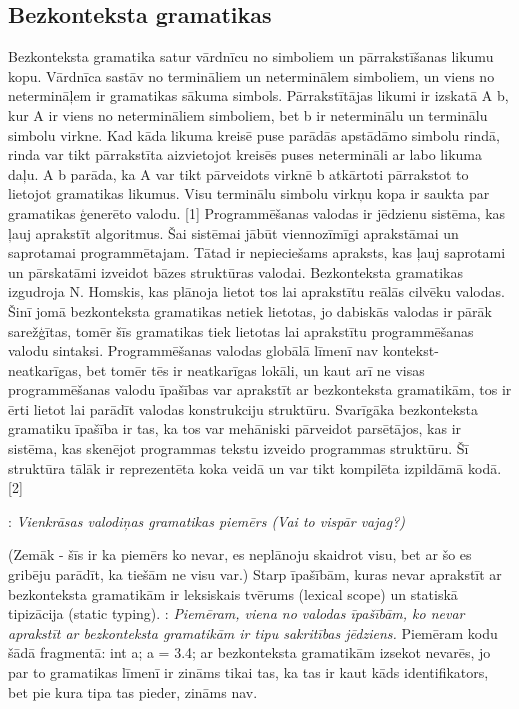 \documentclass[12pt]{report}
\newcommand{\fixme}[1]{\vskip 5mm\noindent{\bf FIXME}: {\it #1}}
\begin{document}
\subsection{Bezkonteksta gramatikas}
Bezkonteksta gramatika satur vārdnīcu no simboliem un pārrakstīšanas likumu kopu. Vārdnīca sastāv no termināliem un neterminālem simboliem, un viens no netermināļem ir gramatikas sākuma simbols. Pārrakstītājas likumi ir izskatā A  b, kur A ir viens no netermināliem simboliem, bet b ir neterminālu un terminālu simbolu virkne. Kad kāda likuma kreisē puse parādās apstādāmo simbolu rindā, rinda var tikt pārrakstīta aizvietojot kreisēs puses netermināli ar labo likuma daļu. A b parāda, ka A var tikt pārveidots virknē b atkārtoti pārrakstot to lietojot gramatikas likumus. Visu terminālu simbolu virkņu kopa ir saukta par gramatikas ģenerēto valodu. [1]
Programmēšanas valodas ir jēdzienu sistēma, kas ļauj aprakstīt algoritmus. Šai sistēmai jābūt viennozīmīgi aprakstāmai un saprotamai programmētajam. Tātad ir nepieciešams apraksts, kas ļauj saprotami un pārskatāmi izveidot bāzes struktūras valodai.
Bezkonteksta gramatikas izgudroja N. Homskis, kas plānoja lietot tos lai aprakstītu reālās cilvēku valodas. Šinī jomā bezkonteksta gramatikas netiek lietotas, jo dabiskās valodas ir pārāk sarežģītas, tomēr šīs gramatikas tiek lietotas lai aprakstītu programmēšanas valodu sintaksi. Programmēšanas valodas globālā līmenī nav kontekst-neatkarīgas, bet tomēr tēs ir neatkarīgas lokāli, un kaut arī ne visas programmēšanas valodu īpašības var aprakstīt ar bezkonteksta gramatikām, tos ir ērti lietot lai parādīt valodas konstrukciju struktūru.
Svarīgāka bezkonteksta gramatiku īpašība ir tas, ka tos var mehāniski pārveidot parsētājos, kas ir sistēma, kas skenējot programmas tekstu izveido programmas struktūru. Šī struktūra tālāk ir reprezentēta koka veidā un  var tikt kompilēta izpildāmā kodā. [2]

\fixme{Vienkrāsas valodiņas gramatikas piemērs (Vai to vispār vajag?)}

(Zemāk - šīs ir ka piemērs ko nevar, es neplānoju skaidrot visu, bet ar šo es gribēju parādīt, ka tiešām ne visu var.)
Starp īpašībām, kuras nevar aprakstīt ar bezkonteksta gramatikām ir leksiskais tvērums (lexical scope) un statiskā tipizācija (static typing).
\fixme{Piemēram, viena no valodas īpašībām, ko nevar aprakstīt ar bezkonteksta gramatikām ir tipu sakritības jēdziens.} Piemēram kodu šādā fragmentā: int a; a = 3.4; ar bezkonteksta gramatikām izsekot nevarēs, jo par to gramatikas līmenī ir zināms tikai tas, ka tas ir kaut kāds identifikators, bet pie kura tipa tas pieder, zināms nav.
\end{document}
